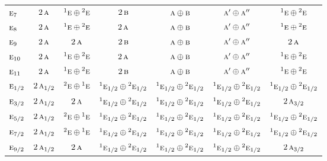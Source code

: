 \documentclass[10pt,a4paper]{article}
\numberwithin{equation}{section}
\newcommand{\irr}[1]{\text{\normalfont\scshape #1}}
\newcommand{\conjpair}[1]{{}^{#1}}
\begin{document}
{\begin{longtable}{@{}lcccccc@{}}
$\irr{e}_{7}$ & $2\,\irr{a}$ & $\conjpair{1}\irr{e}\oplus \conjpair{2}\irr{e}$ & $2\,\irr{b}$ & $\irr{a}\oplus \irr{b}$ & $\irr{a}'\oplus \irr{a}''$ & $\conjpair{1}\irr{e}\oplus \conjpair{2}\irr{e}$\\
$\irr{e}_{8}$ & $2\,\irr{a}$ & $\conjpair{1}\irr{e}\oplus \conjpair{2}\irr{e}$ & $2\,\irr{a}$ & $\irr{a}\oplus \irr{b}$ & $\irr{a}'\oplus \irr{a}''$ & $\conjpair{1}\irr{e}\oplus \conjpair{2}\irr{e}$\\
$\irr{e}_{9}$ & $2\,\irr{a}$ & $2\,\irr{a}$ & $2\,\irr{b}$ & $\irr{a}\oplus \irr{b}$ & $\irr{a}'\oplus \irr{a}''$ & $2\,\irr{a}$\\
$\irr{e}_{10}$ & $2\,\irr{a}$ & $\conjpair{1}\irr{e}\oplus \conjpair{2}\irr{e}$ & $2\,\irr{a}$ & $\irr{a}\oplus \irr{b}$ & $\irr{a}'\oplus \irr{a}''$ & $\conjpair{1}\irr{e}\oplus \conjpair{2}\irr{e}$\\
$\irr{e}_{11}$ & $2\,\irr{a}$ & $\conjpair{1}\irr{e}\oplus \conjpair{2}\irr{e}$ & $2\,\irr{b}$ & $\irr{a}\oplus \irr{b}$ & $\irr{a}'\oplus \irr{a}''$ & $\conjpair{1}\irr{e}\oplus \conjpair{2}\irr{e}$\\
$\irr{e}_{1/2}$ & $2\,\irr{a}_{1/2}$ & $\conjpair{2}\irr{e}\oplus \conjpair{1}\irr{e}$ & $\conjpair{1}\irr{e}_{1/2}\oplus \conjpair{2}\irr{e}_{1/2}$ & $\conjpair{1}\irr{e}_{1/2}\oplus \conjpair{2}\irr{e}_{1/2}$ & $\conjpair{1}\irr{e}_{1/2}\oplus \conjpair{2}\irr{e}_{1/2}$ & $\conjpair{1}\irr{e}_{1/2}\oplus \conjpair{2}\irr{e}_{1/2}$\\
$\irr{e}_{3/2}$ & $2\,\irr{a}_{1/2}$ & $2\,\irr{a}$ & $\conjpair{1}\irr{e}_{1/2}\oplus \conjpair{2}\irr{e}_{1/2}$ & $\conjpair{1}\irr{e}_{1/2}\oplus \conjpair{2}\irr{e}_{1/2}$ & $\conjpair{1}\irr{e}_{1/2}\oplus \conjpair{2}\irr{e}_{1/2}$ & $2\,\irr{a}_{3/2}$\\
$\irr{e}_{5/2}$ & $2\,\irr{a}_{1/2}$ & $\conjpair{2}\irr{e}\oplus \conjpair{1}\irr{e}$ & $\conjpair{1}\irr{e}_{1/2}\oplus \conjpair{2}\irr{e}_{1/2}$ & $\conjpair{1}\irr{e}_{1/2}\oplus \conjpair{2}\irr{e}_{1/2}$ & $\conjpair{1}\irr{e}_{1/2}\oplus \conjpair{2}\irr{e}_{1/2}$ & $\conjpair{1}\irr{e}_{1/2}\oplus \conjpair{2}\irr{e}_{1/2}$\\
$\irr{e}_{7/2}$ & $2\,\irr{a}_{1/2}$ & $\conjpair{2}\irr{e}\oplus \conjpair{1}\irr{e}$ & $\conjpair{1}\irr{e}_{1/2}\oplus \conjpair{2}\irr{e}_{1/2}$ & $\conjpair{1}\irr{e}_{1/2}\oplus \conjpair{2}\irr{e}_{1/2}$ & $\conjpair{1}\irr{e}_{1/2}\oplus \conjpair{2}\irr{e}_{1/2}$ & $\conjpair{1}\irr{e}_{1/2}\oplus \conjpair{2}\irr{e}_{1/2}$\\
$\irr{e}_{9/2}$ & $2\,\irr{a}_{1/2}$ & $2\,\irr{a}$ & $\conjpair{1}\irr{e}_{1/2}\oplus \conjpair{2}\irr{e}_{1/2}$ & $\conjpair{1}\irr{e}_{1/2}\oplus \conjpair{2}\irr{e}_{1/2}$ & $\conjpair{1}\irr{e}_{1/2}\oplus \conjpair{2}\irr{e}_{1/2}$ & $2\,\irr{a}_{3/2}$\\

\end{longtable}}
\end{document}
